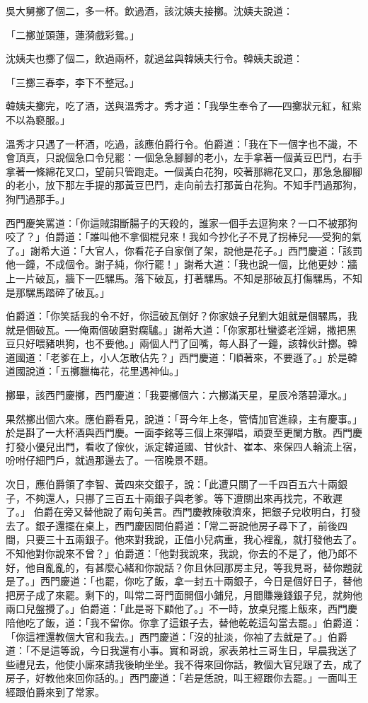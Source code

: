 吳大舅擲了個二，多一杯。飲過酒，該沈姨夫接擲。沈姨夫說道：

「二擲並頭蓮，蓮漪戲彩鴛。」

沈姨夫也擲了個二，飲過兩杯，就過盆與韓姨夫行令。韓姨夫說道：

「三擲三春李，李下不整冠。」

韓姨夫擲完，吃了酒，送與溫秀才。秀才道：「我學生奉令了──四擲狀元紅，紅紫不以為褻服。」

溫秀才只遇了一杯酒，吃過，該應伯爵行令。伯爵道：「我在下一個字也不識，不會頂真，只說個急口令兒罷：一個急急腳腳的老小，左手拿著一個黃豆巴鬥，右手拿著一條綿花叉口，望前只管跑走。一個黃白花狗，咬著那綿花叉口，那急急腳腳的老小，放下那左手提的那黃豆巴鬥，走向前去打那黃白花狗。不知手鬥過那狗，狗鬥過那手。」

西門慶笑罵道：「你這賊謅斷腸子的天殺的，誰家一個手去逗狗來？一口不被那狗咬了？」伯爵道：「誰叫他不拿個棍兒來！我如今抄化子不見了拐棒兒──受狗的氣了。」謝希大道：「大官人，你看花子自家倒了架，說他是花子。」西門慶道：「該罰他一鐘，不成個令。謝子純，你行罷！」謝希大道：「我也說一個，比他更妙：牆上一片破瓦，牆下一匹騾馬。落下破瓦，打著騾馬。不知是那破瓦打傷騾馬，不知是那騾馬踏碎了破瓦。」

伯爵道：「你笑話我的令不好，你這破瓦倒好？你家娘子兒劉大姐就是個騾馬，我就是個破瓦。──俺兩個破磨對瘸驢。」謝希大道：「你家那杜蠻婆老淫婦，撒把黑豆只好喂豬哄狗，也不要他。」兩個人鬥了回嘴，每人斟了一鐘，該韓伙計擲。韓道國道：「老爹在上，小人怎敢佔先？」西門慶道：「順著來，不要遜了。」於是韓道國說道：「五擲臘梅花，花里遇神仙。」

擲畢，該西門慶擲，西門慶道：「我要擲個六：六擲滿天星，星辰冷落碧潭水。」

果然擲出個六來。應伯爵看見，說道：「哥今年上冬，管情加官進祿，主有慶事。」於是斟了一大杯酒與西門慶。一面李銘等三個上來彈唱，頑耍至更闌方散。西門慶打發小優兒出門，看收了傢伙，派定韓道國、甘伙計、崔本、來保四人輪流上宿，吩咐仔細門戶，就過那邊去了。一宿晚景不題。

次日，應伯爵領了李智、黃四來交銀子，說：「此遭只關了一千四百五六十兩銀子，不夠還人，只挪了三百五十兩銀子與老爹。等下遭關出來再找完，不敢遲了。」 伯爵在旁又替他說了兩句美言。西門慶教陳敬濟來，把銀子兌收明白，打發去了。銀子還擺在桌上，西門慶因問伯爵道：「常二哥說他房子尋下了，前後四間，只要三十五兩銀子。他來對我說，正值小兒病重，我心裡亂，就打發他去了。不知他對你說來不曾？」伯爵道：「他對我說來，我說，你去的不是了，他乃郎不好，他自亂亂的，有甚麼心緒和你說話？你且休回那房主兒，等我見哥，替你題就是了。」西門慶道：「也罷，你吃了飯，拿一封五十兩銀子，今日是個好日子，替他把房子成了來罷。剩下的，叫常二哥門面開個小鋪兒，月間賺幾錢銀子兒，就夠他兩口兒盤攪了。」伯爵道：「此是哥下顧他了。」不一時，放桌兒擺上飯來，西門慶陪他吃了飯，道：「我不留你。你拿了這銀子去，替他乾乾這勾當去罷。」伯爵道：「你這裡還教個大官和我去。」西門慶道：「沒的扯淡，你袖了去就是了。」伯爵道：「不是這等說，今日我還有小事。實和哥說，家表弟杜三哥生日，早晨我送了些禮兒去，他使小廝來請我後晌坐坐。我不得來回你話，教個大官兒跟了去，成了房子，好教他來回你話的。」西門慶道：「若是恁說，叫王經跟你去罷。」一面叫王經跟伯爵來到了常家。

